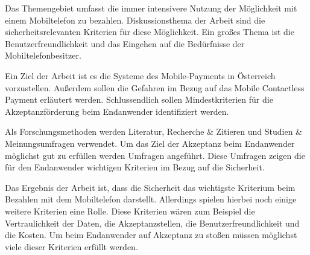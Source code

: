 
 Das Themengebiet umfasst die immer intensivere Nutzung der Möglichkeit mit einem Mobiltelefon
zu bezahlen. Diskussionsthema der Arbeit sind die sicherheitsrelevanten Kriterien für diese Möglichkeit. Ein großes Thema
ist die Benutzerfreundlichkeit und das Eingehen auf die Bedürfnisse der Mobiltelefonbesitzer. \cite[Kap.~1]{Hren2008}

 Ein Ziel der Arbeit ist es die Systeme des Mobile-Payments in Österreich vorzustellen. Außerdem
sollen die Gefahren im Bezug auf das Mobile Contactless Payment erläutert werden. Schlussendlich sollen Mindestkriterien
für die Akzeptanzförderung beim Endanwender identifiziert werden. \cite[Kap.~1.1]{Hren2008}

 Als Forschungsmethoden werden Literatur, Recherche \& Zitieren und Studien \& Meinungsumfragen
verwendet. Um das Ziel der Akzeptanz beim Endanwender möglichst gut zu erfüllen werden Umfragen angeführt. Diese Umfragen
zeigen die für den Endanwender wichtigen Kriterien im Bezug auf die Sicherheit. \cite[Kap.~1,7]{Hren2008}

 Das Ergebnis der Arbeit ist, dass die Sicherheit das wichtigste Kriterium beim Bezahlen mit dem 
Mobiltelefon darstellt. Allerdings spielen hierbei noch einige weitere Kriterien eine Rolle. Diese Kriterien wären zum
Beispiel die Vertraulichkeit der Daten, die Akzeptanzstellen, die Benutzerfreundlichkeit und die Kosten. Um beim 
Endanwender auf Akzeptanz zu stoßen müssen möglichst viele dieser Kriterien erfüllt werden. \cite[Kap.~8]{Hren2008}


